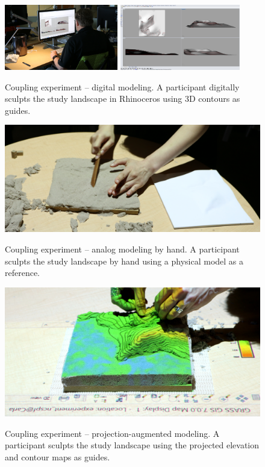 \documentclass[prodmode,acmtochi]{acmsmall} %
\begin{document}
\begin{figure}
\begin{center}
	\includegraphics[height=108px]{images/experiments/art_rhino.jpg}
	\includegraphics[height=108px]{images/experiments/rhino.png}
	\caption{Coupling experiment -- digital modeling.
	A participant digitally sculpts the study landscape in Rhinoceros
	using 3D contours as guides.}
	\label{fig:rhino}
	\vspace*{0.5em}
	\includegraphics[width=\textwidth]{images/experiments/connie_analog_1.jpg}
	\caption{Coupling experiment -- analog modeling by hand.
	A participant sculpts the study landscape by hand
	using a physical model as a reference.}
	\label{fig:analog}
	\vspace*{0.5em}
	\includegraphics[width=\textwidth]{images/experiments/carla_proj_aug.jpg}
	\caption{Coupling experiment -- projection-augmented modeling.
	A participant sculpts the study landscape using
	the projected elevation and contour maps
	as guides.}
	\label{fig:proj_aug}
\end{center}
\end{figure}
\end{document}
